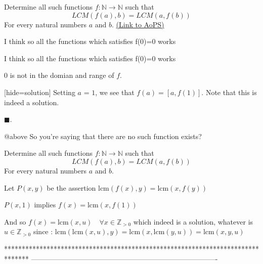 \begin{problem}
	Determine all such functions $f: \mathbb{N} \to \mathbb{N} $ such that
 \[ 
LCM(f(a),b) = LCM(a,f(b))
\]
For every natural numbers $a$ and $b$.
	\flushright \href{https://artofproblemsolving.com/community/c6h1631610}{(Link to AoPS)}
\end{problem}



\begin{solution}
	I think so all the functions which satisfies f(0)=0 works 
\end{solution}



\begin{solution}
	\begin{tcolorbox}I think so all the functions which satisfies f(0)=0 works\end{tcolorbox}

$0$ is not in the domian and range of $f$.

[hide=solution]
Setting $a$ = $1$, we see that $f(a)=[a,f(1)]$. Note that this is indeed a solution.

$\blacksquare$.
\end{solution}



\begin{solution}
	@above So you're saying that there are no such function exists?
\end{solution}



\begin{solution}
	\begin{tcolorbox}Determine all such functions $f: \mathbb{N} \to \mathbb{N} $ such that
 \[ 
LCM(f(a),b) = LCM(a,f(b))
\]
For every natural numbers $a$ and $b$.\end{tcolorbox}
Let $P(x,y)$ be the assertion $\text{lcm}(f(x),y)=\text{lcm}(x,f(y))$

$P(x,1)$ implies $f(x)=\text{lcm}(x,f(1))$

And so $\boxed{f(x)=\text{lcm} (x,u)\quad\forall x\in\mathbb Z_{>0}}$ which indeed is a solution, whatever is $u\in\mathbb Z_{>0}$ since :
$\text{lcm}(\text{lcm}(x,u),y)=\text{lcm}(x,\text{lcm}(y,u))=\text{lcm}(x,y,u)$


\end{solution}
*******************************************************************************
-------------------------------------------------------------------------------

